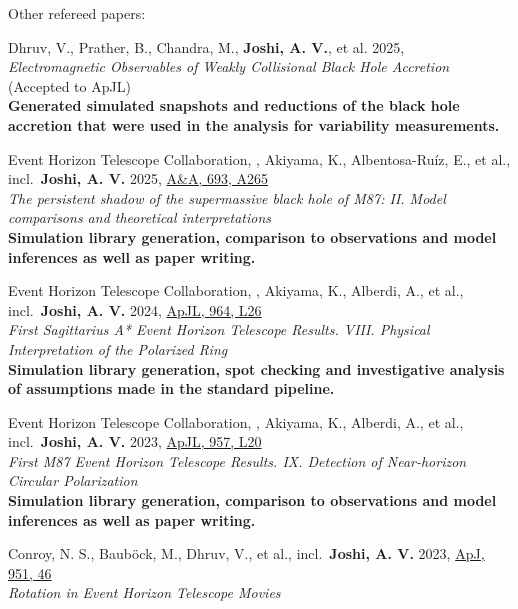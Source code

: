 \documentclass[11pt]{article}
\begin{document}
Other refereed papers:
\begin{etaremune}

    \item Dhruv, V., Prather, B., Chandra, M., \textbf{Joshi, A. V.}, et al. 2025, \href{https://ui.adsabs.harvard.edu/abs/2025arXiv251011365D}{\color{arxivcolor}{arXiv}}\\\textit{Electromagnetic Observables of Weakly Collisional Black Hole Accretion}\\(Accepted to ApJL)\\\textbf{Generated simulated snapshots and reductions of the black hole accretion that were used in the analysis for variability measurements.} 
    
    \item Event Horizon Telescope Collaboration, , Akiyama, K., Albentosa-Ruíz, E., et al., incl.\ \textbf{Joshi, A. V.} 2025, \href{https://ui.adsabs.harvard.edu/abs/2025A\&A...693A.265E}{A\&A, 693, A265}\\\textit{The persistent shadow of the supermassive black hole of M87: II. Model comparisons and theoretical interpretations}\\\textbf{Simulation library generation, comparison to observations and model inferences as well as paper writing.}

    \item Event Horizon Telescope Collaboration, , Akiyama, K., Alberdi, A., et al., incl.\ \textbf{Joshi, A. V.} 2024, \href{https://ui.adsabs.harvard.edu/abs/2024ApJ...964L..26E}{ApJL, 964, L26}\\\textit{First Sagittarius A* Event Horizon Telescope Results. VIII. Physical Interpretation of the Polarized Ring}\\\textbf{Simulation library generation, spot checking and investigative analysis of assumptions made in the standard pipeline.}

    \item Event Horizon Telescope Collaboration, , Akiyama, K., Alberdi, A., et al., incl.\ \textbf{Joshi, A. V.} 2023, \href{https://ui.adsabs.harvard.edu/abs/2023ApJ...957L..20E}{ApJL, 957, L20}\\\textit{First M87 Event Horizon Telescope Results. IX. Detection of Near-horizon Circular Polarization}\\\textbf{Simulation library generation, comparison to observations and model inferences as well as paper writing.}

    \item Conroy, N. S., Bauböck, M., Dhruv, V., et al., incl.\ \textbf{Joshi, A. V.} 2023, \href{https://ui.adsabs.harvard.edu/abs/2023ApJ...951...46C}{ApJ, 951, 46}\\\textit{Rotation in Event Horizon Telescope Movies}




\end{etaremune}
\end{document}
